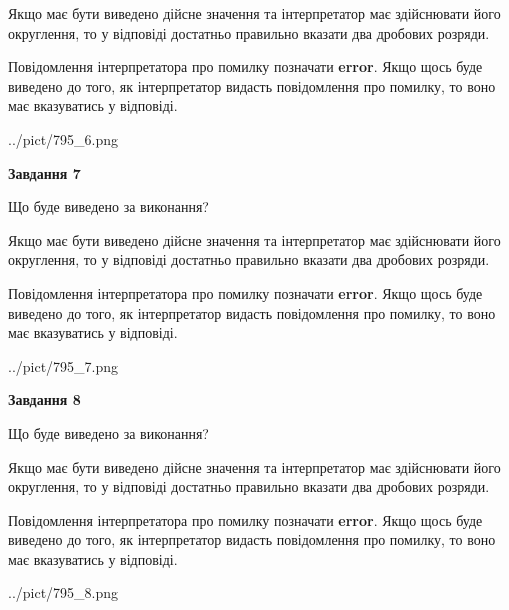 \documentclass[12pt, ukrainian]{article}
\begin{document}
{\begin {Large}
Якщо має бути виведено дійсне значення та інтерпретатор має здійснювати його округлення, 
то у відповіді достатньо правильно вказати два дробових розряди.

Повідомлення інтерпретатора про помилку позначати \textbf{error}.
Якщо щось буде виведено до того, як інтерпретатор видасть повідомлення про помилку, 
то воно має вказуватись у відповіді. \par

\begin{center}
	{../pict/795_6.png}
\end{center}
\newpage

{\begin {center}\textbf{Завдання 7}\end {center}}\par
Що буде виведено за виконання? \par

Якщо має бути виведено дійсне значення та інтерпретатор має здійснювати його округлення, 
то у відповіді достатньо правильно вказати два дробових розряди.

Повідомлення інтерпретатора про помилку позначати \textbf{error}.
Якщо щось буде виведено до того, як інтерпретатор видасть повідомлення про помилку, 
то воно має вказуватись у відповіді. \par

\begin{center}
	{../pict/795_7.png}
\end{center}
\newpage

{\begin {center}\textbf{Завдання 8}\end {center}}\par
Що буде виведено за виконання? \par

Якщо має бути виведено дійсне значення та інтерпретатор має здійснювати його округлення, 
то у відповіді достатньо правильно вказати два дробових розряди.

Повідомлення інтерпретатора про помилку позначати \textbf{error}.
Якщо щось буде виведено до того, як інтерпретатор видасть повідомлення про помилку, 
то воно має вказуватись у відповіді. \par

\begin{center}
	{../pict/795_8.png}
\end{center}
\newpage


\end{Large}}
\end{document}

